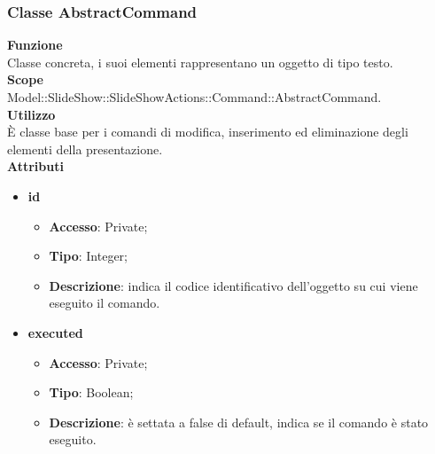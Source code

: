 {{	\subsubsection{Classe AbstractCommand}{
		\textbf{Funzione}\\
			\indent Classe concreta, i suoi elementi rappresentano un oggetto di tipo testo.\\
	   	\textbf{Scope}\\
			\indent Model::SlideShow::SlideShowActions::Command::AbstractCommand.\\
		\textbf{Utilizzo}\\
			\indent È classe base per i comandi di modifica, inserimento ed eliminazione degli elementi della presentazione.\\
		\textbf{Attributi}
		\begin{itemize}
			\item \textbf{id}
			\begin{itemize}
				\item \textbf{Accesso}: Private;
				\item \textbf{Tipo}: Integer;
				\item \textbf{Descrizione}: indica il codice identificativo dell’oggetto su cui viene eseguito il comando.
			\end{itemize}
			\item \textbf{executed}
			\begin{itemize}
				\item \textbf{Accesso}: Private;
				\item \textbf{Tipo}: Boolean;
				\item \textbf{Descrizione}: è settata a false di default, indica se il comando è stato eseguito.
			\end{itemize}
		\end{itemize}
		
}}}
